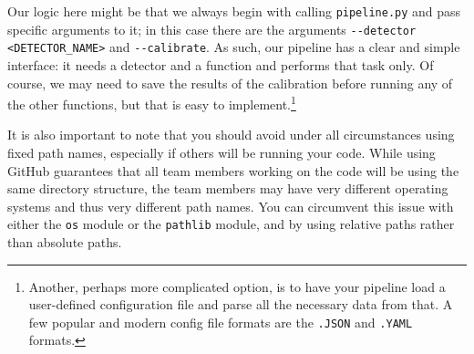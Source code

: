 \documentclass{tufte-book}
\begin{document}
Our logic here might be that we always begin with calling \verb|pipeline.py| and pass specific arguments to it; in this case there are the arguments \verb|--detector <DETECTOR_NAME>| and \verb|--calibrate|. As such, our pipeline has a clear and simple interface: it needs a detector and a function and performs that task only. Of course, we may need to save the results of the calibration before running any of the other functions, but that is easy to implement.\footnote{Another, perhaps more complicated option, is to have your pipeline load a user-defined configuration file and parse all the necessary data from that. A few popular and modern config file formats are the \texttt{.JSON} and \texttt{.YAML} formats.} 

It is also important to note that you should avoid under all circumstances using fixed path names, especially if others will be running your code. While using GitHub guarantees that all team members working on the code will be using the same directory structure, the team members may have very different operating systems and thus very different path names. You can circumvent this issue with either the \verb|os| module or the \verb|pathlib| module, and by using relative paths rather than absolute paths.




\end{document}
